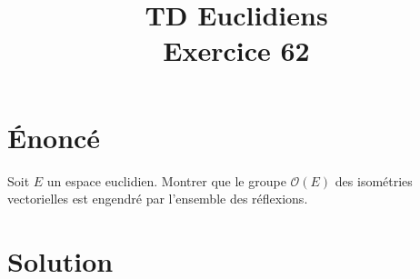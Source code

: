 \documentclass[french]{article}
\title{TD Euclidiens\\ Exercice 62}
\date{}
\begin{document}
\maketitle

\section{Énoncé}
Soit $E$ un espace euclidien. Montrer que le groupe $\mathcal{O}(E)$ des isométries vectorielles est engendré par l'ensemble des réflexions.
\section{Solution}
\end{document}
